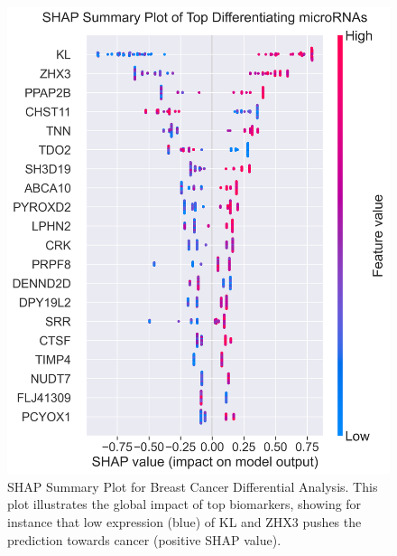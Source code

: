 \documentclass[journal]{IEEEtran}
\begin{document}
\begin{figure}[htbp]
\centering
\includegraphics[width=0.9\linewidth]{breast_cancer_figures/differential/shap_summary_plot_healthy_and_c.png}
\caption{SHAP Summary Plot for Breast Cancer Differential Analysis. This plot illustrates the global impact of top biomarkers, showing for instance that low expression (blue) of KL and ZHX3 pushes the prediction towards cancer (positive SHAP value).}
\label{fig:breast_shap_summary}
\end{figure}
\end{document}
